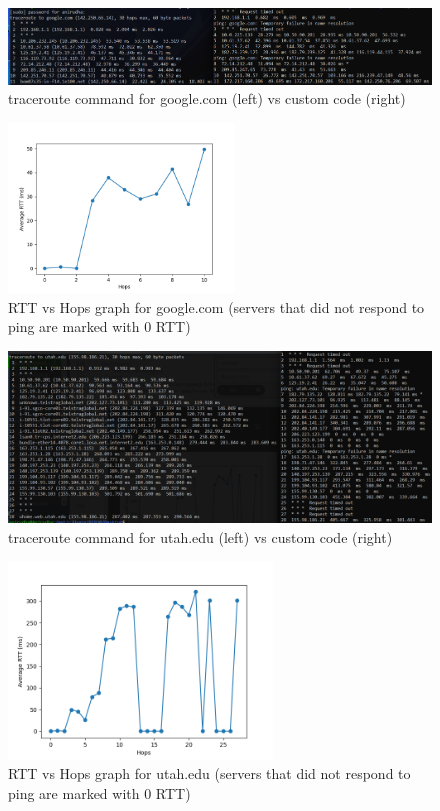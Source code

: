 \documentclass[]{assignment}
\begin{document}
            \begin{figure}[hbt!]
    \centering
    \includegraphics[width=18cm]{assignment-1/report/googleping.png}
    \caption{traceroute command for google.com (left) vs custom code (right)}
    \label{fig:galaxy}
    \end{figure}
        \begin{figure}[hbt!]
    \centering
    \includegraphics[width=6cm]{assignment-1/report/trace-google.com.png}
    \caption{RTT vs Hops graph for google.com (servers that did not respond to ping are marked with 0 RTT)}
    \label{fig:galaxy}
    \end{figure}
                \begin{figure}[hbt!]
    \centering
    \includegraphics[width=18cm]{assignment-1/report/utah.png}
    \caption{traceroute command for utah.edu (left) vs custom code (right)}
    \label{fig:galaxy}
    \end{figure}
        \begin{figure}[hbt!]
    \centering
    \includegraphics[width=7cm]{assignment-1/report/trace-utah.edu.png}
    \caption{RTT vs Hops graph for utah.edu (servers that did not respond to ping are marked with 0 RTT)}
    \label{fig:galaxy}
    \end{figure}
\end{document}
